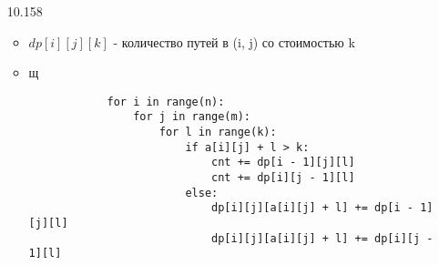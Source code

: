 \documentclass{article}
\begin{document}
\begin{enumerate}
    \item [10.158]
    \begin{itemize}
        \item $dp[i][j][k]$ - количество путей в (i, j) со стоимостью k
        \item щ
        \begin{lstlisting}
            for i in range(n):
                for j in range(m):
                    for l in range(k):
                        if a[i][j] + l > k:
                            cnt += dp[i - 1][j][l]
                            cnt += dp[i][j - 1][l]
                        else:
                            dp[i][j][a[i][j] + l] += dp[i - 1][j][l]
                            dp[i][j][a[i][j] + l] += dp[i][j - 1][l]
        \end{lstlisting}
    \end{itemize}
\end{enumerate}
\end{document}
